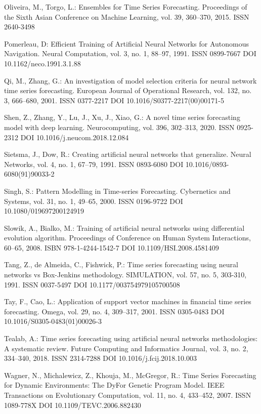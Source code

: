 \begin{thebibliography}{99.}
 Oliveira, M., Torgo, L.: Ensembles for Time Series Forecasting. Proceedings of the Sixth Asian Conference on Machine Learning, vol. 39, 360--370, 2015. ISSN 2640-3498

 Pomerleau, D: Efficient Training of Artificial Neural Networks for Autonomous Navigation. Neural Computation, vol. 3, no. 1, 88--97, 1991. ISSN 0899-7667 DOI 10.1162/neco.1991.3.1.88

 Qi, M., Zhang, G.: An investigation of model selection criteria for neural network time series forecasting. European Journal of Operational Research, vol. 132, no. 3, 666--680, 2001. ISSN 0377-2217 DOI 10.1016/S0377-2217(00)00171-5

 Shen, Z., Zhang, Y., Lu, J., Xu, J., Xiao, G.: A novel time series forecasting model with deep learning. Neurocomputing, vol. 396, 302--313, 2020. ISSN 0925-2312 DOI 10.1016/j.neucom.2018.12.084

 Sietsma, J., Dow, R.: Creating artificial neural networks that generalize. Neural Networks, vol. 4, no. 1, 67--79, 1991. ISSN 0893-6080 DOI 10.1016/0893-6080(91)90033-2

 Singh, S.: Pattern Modelling in Time-series Forecasting. Cybernetics and Systems, vol. 31, no. 1, 49--65, 2000. ISSN 0196-9722 DOI 10.1080/019697200124919

 Slowik, A., Bialko, M.: Training of artificial neural networks using differential evolution algorithm. Proceedings of Conference on Human System Interactions, 60--65, 2008. ISBN 978-1-4244-1542-7 DOI 10.1109/HSI.2008.4581409

 Tang, Z., de Almeida, C., Fishwick, P.: Time series forecasting using neural networks vs Box-Jenkins methodology. SIMULATION, vol. 57, no. 5, 303-310, 1991. ISSN 0037-5497 DOI 10.1177/003754979105700508

 Tay, F., Cao, L.: Application of support vector machines in financial time series forecasting. Omega, vol. 29, no. 4, 309--317, 2001. ISSN 0305-0483 DOI 10.1016/S0305-0483(01)00026-3

 Tealab, A.: Time series forecasting using artificial neural networks methodologies: A systematic review. Future Computing and Informatics Journal, vol. 3, no. 2, 334--340, 2018. ISSN 2314-7288 DOI 10.1016/j.fcij.2018.10.003

 Wagner, N., Michalewicz, Z., Khouja, M., McGregor, R.: Time Series Forecasting for Dynamic Environments: The DyFor Genetic Program Model. IEEE Transactions on Evolutionary Computation, vol. 11, no. 4, 433--452, 2007. ISSN 1089-778X DOI 10.1109/TEVC.2006.882430


\end{thebibliography}
